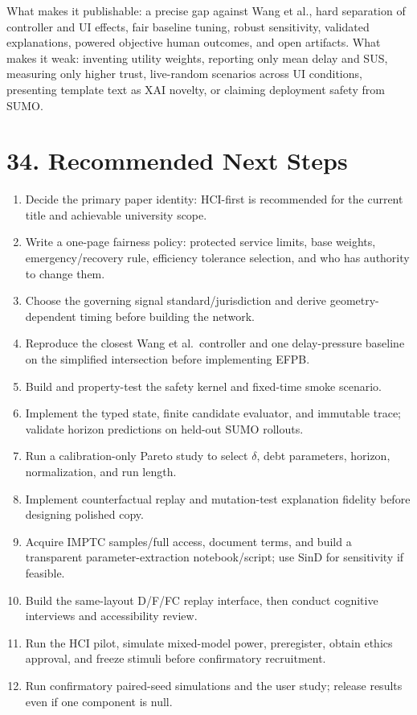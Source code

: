 \documentclass[
  english,
  11pt,
  a4paper,
]{article}
\providecommand{\tightlist}{%
  \setlength{\itemsep}{0pt}\setlength{\parskip}{0pt}}
\begin{document}
What makes it publishable: a precise gap against Wang et al., hard
separation of controller and UI effects, fair baseline tuning, robust
sensitivity, validated explanations, powered objective human outcomes,
and open artifacts. What makes it weak: inventing utility weights,
reporting only mean delay and SUS, measuring only higher trust,
live-random scenarios across UI conditions, presenting template text as
XAI novelty, or claiming deployment safety from SUMO.

\section{34. Recommended Next Steps}\label{recommended-next-steps}

\begin{enumerate}
\def\labelenumi{\arabic{enumi}.}
\tightlist
\item
  Decide the primary paper identity: HCI-first is recommended for the
  current title and achievable university scope.
\item
  Write a one-page fairness policy: protected service limits, base
  weights, emergency/recovery rule, efficiency tolerance selection, and
  who has authority to change them.
\item
  Choose the governing signal standard/jurisdiction and derive
  geometry-dependent timing before building the network.
\item
  Reproduce the closest Wang et al.~controller and one delay-pressure
  baseline on the simplified intersection before implementing EFPB.
\item
  Build and property-test the safety kernel and fixed-time smoke
  scenario.
\item
  Implement the typed state, finite candidate evaluator, and immutable
  trace; validate horizon predictions on held-out SUMO rollouts.
\item
  Run a calibration-only Pareto study to select \(\delta\), debt parameters,
  horizon, normalization, and run length.
\item
  Implement counterfactual replay and mutation-test explanation fidelity
  before designing polished copy.
\item
  Acquire IMPTC samples/full access, document terms, and build a
  transparent parameter-extraction notebook/script; use SinD for
  sensitivity if feasible.
\item
  Build the same-layout D/F/FC replay interface, then conduct cognitive
  interviews and accessibility review.
\item
  Run the HCI pilot, simulate mixed-model power, preregister, obtain
  ethics approval, and freeze stimuli before confirmatory recruitment.
\item
  Run confirmatory paired-seed simulations and the user study; release
  results even if one component is null.
\end{enumerate}
\end{document}
